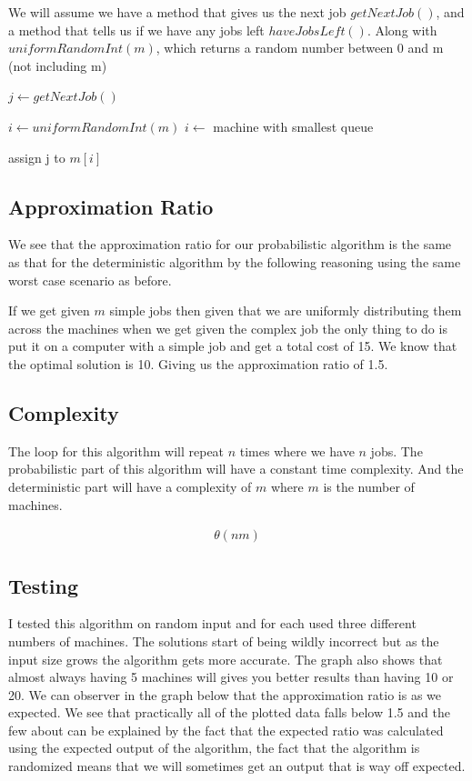 \documentclass{article}
\begin{document}
			We will assume we have a method that gives us the next job $getNextJob()$, and a method that tells us if we have any jobs left $haveJobsLeft()$. Along with $uniformRandomInt(m)$, which returns a random number between 0 and m (not including m)
			\begin{algorithm}
				\begin{algorithmic}[1]
							\State $j \gets getNextJob()$
							
								\State $i \gets uniformRandomInt(m)$
							\Else
								\State $i \gets$ machine with smallest queue
							\EndIf
							
							\State assign j to $m[i]$
						\EndWhile
					\EndProcedure
				\end{algorithmic}
			\end{algorithm}	
	
		\subsection{Approximation Ratio}
			We see that the approximation ratio for our probabilistic algorithm is the same as that for the deterministic algorithm by the following reasoning using the same worst case scenario as before.\newline
			
			If we get given $m$ simple jobs then given that we are uniformly distributing them across the machines when we get given the complex job the only thing to do is put it on a computer with a simple job and get a total cost of 15. We know that the optimal solution is 10. Giving us the approximation ratio of 1.5.
	
		\subsection{Complexity}
			The loop for this algorithm will repeat $n$ times where we have $n$ jobs. The probabilistic part of this algorithm will have a constant time complexity. And the deterministic part will have a complexity of $m$ where $m$ is the number of machines. 
			
			\begin{align*}
				\theta(nm)
			\end{align*}
			
		\subsection{Testing}
			I tested this algorithm on random input and for each used three different numbers of machines. The solutions start of being wildly incorrect but as the input size grows the algorithm gets more accurate. The graph also shows that almost always having 5 machines will gives you better results than having 10 or 20. We can observer in the graph below that the approximation ratio is as we expected. We see that practically all of the plotted data falls below 1.5 and the few about can be explained by the fact that the expected ratio was calculated using the expected output of the algorithm, the fact that the algorithm is randomized means that we will sometimes get an output that is way off expected. 
			
\end{document}
